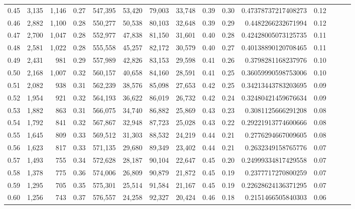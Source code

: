 \begin{tabular}{rrrrrrrrrrrrrrr}
0.45 &   3,135 &  1,146 &  0.27 &  547,395 &   53,420 &   79,003 &   33,748 &  0.39 &  0.30 &   0.47378737217408273 &      0.12 \\
0.46 &   2,882 &  1,100 &  0.28 &  550,277 &   50,538 &   80,103 &   32,648 &  0.39 &  0.29 &    0.4482266232671994 &      0.12 \\
0.47 &   2,700 &  1,047 &  0.28 &  552,977 &   47,838 &   81,150 &   31,601 &  0.40 &  0.28 &   0.42428005073125735 &      0.11 \\
0.48 &   2,581 &  1,022 &  0.28 &  555,558 &   45,257 &   82,172 &   30,579 &  0.40 &  0.27 &   0.40138890120708465 &      0.11 \\
0.49 &   2,431 &    981 &  0.29 &  557,989 &   42,826 &   83,153 &   29,598 &  0.41 &  0.26 &    0.3798281168237976 &      0.10 \\
0.50 &   2,168 &  1,007 &  0.32 &  560,157 &   40,658 &   84,160 &   28,591 &  0.41 &  0.25 &   0.36059990598753006 &      0.10 \\
0.51 &   2,082 &    938 &  0.31 &  562,239 &   38,576 &   85,098 &   27,653 &  0.42 &  0.25 &   0.34213443783203695 &      0.09 \\
0.52 &   1,954 &    921 &  0.32 &  564,193 &   36,622 &   86,019 &   26,732 &  0.42 &  0.24 &   0.32480421459676634 &      0.09 \\
0.53 &   1,882 &    863 &  0.31 &  566,075 &   34,740 &   86,882 &   25,869 &  0.43 &  0.23 &    0.3081125666291208 &      0.08 \\
0.54 &   1,792 &    841 &  0.32 &  567,867 &   32,948 &   87,723 &   25,028 &  0.43 &  0.22 &   0.29221913774600666 &      0.08 \\
0.55 &   1,645 &    809 &  0.33 &  569,512 &   31,303 &   88,532 &   24,219 &  0.44 &  0.21 &    0.2776294667009605 &      0.08 \\
0.56 &   1,623 &    817 &  0.33 &  571,135 &   29,680 &   89,349 &   23,402 &  0.44 &  0.21 &    0.2632349158765776 &      0.07 \\
0.57 &   1,493 &    755 &  0.34 &  572,628 &   28,187 &   90,104 &   22,647 &  0.45 &  0.20 &   0.24999334817429558 &      0.07 \\
0.58 &   1,378 &    775 &  0.36 &  574,006 &   26,809 &   90,879 &   21,872 &  0.45 &  0.19 &    0.2377717270800259 &      0.07 \\
0.59 &   1,295 &    705 &  0.35 &  575,301 &   25,514 &   91,584 &   21,167 &  0.45 &  0.19 &   0.22628624136371295 &      0.07 \\
0.60 &   1,256 &    743 &  0.37 &  576,557 &   24,258 &   92,327 &   20,424 &  0.46 &  0.18 &    0.2151466505840303 &      0.06 \\

\end{tabular}
